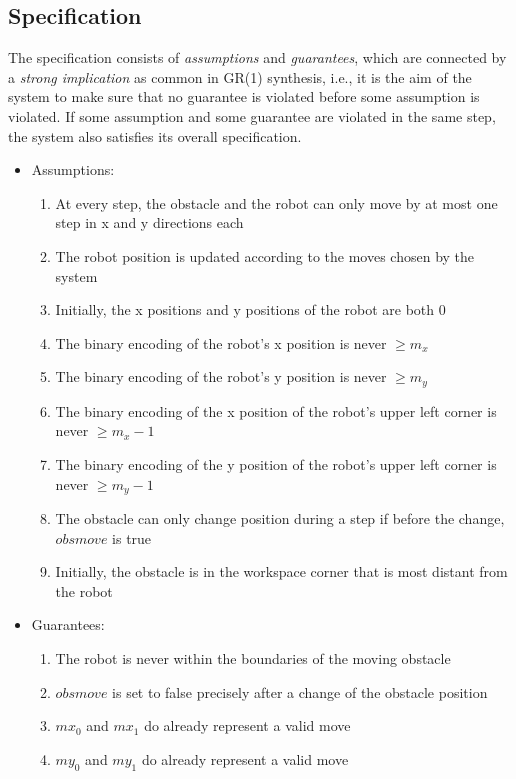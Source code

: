 \documentclass[a4paper,conference,10pt]{IEEEtran}
\begin{document}
\subsection{Specification}
The specification consists of \emph{assumptions} and \emph{guarantees}, which are connected by a \emph{strong implication} as common in GR(1) synthesis, i.e., it is the aim of the system to make sure that no guarantee is violated before some assumption is violated. If some assumption and some guarantee are violated in the same step, the system also satisfies its overall specification.
\begin{itemize}
\item Assumptions:
\begin{enumerate}
\item At every step, the obstacle and the robot can only move by at most one step in x and y directions each
\item The robot position is updated according to the moves chosen by the system
\item Initially, the x positions and y positions of the robot are both $0$
\item The binary encoding of the robot's x position is never $\geq m_x$
\item The binary encoding of the robot's y position is never $\geq m_y$
\item The binary encoding of the x position of the robot's upper left corner is never $\geq m_x - 1$
\item The binary encoding of the y position of the robot's upper left corner is never $\geq m_y - 1$
\item \label{item:ObsMove} The obstacle can only change position during a step if before the change, $\mathit{obsmove}$ is true
\item Initially, the obstacle is in the workspace corner that is most distant from the robot
\end{enumerate}
\item Guarantees:
\begin{enumerate}
\item The robot is never within the boundaries of the moving obstacle
\item $\mathit{obsmove}$ is set to false precisely after a change of the obstacle position
\item $\mathit{mx}_0$ and $\mathit{mx}_1$ do already represent a valid move
\item $\mathit{my}_0$ and $\mathit{my}_1$ do already represent a valid move
\end{enumerate}
\end{itemize}
\end{document}
